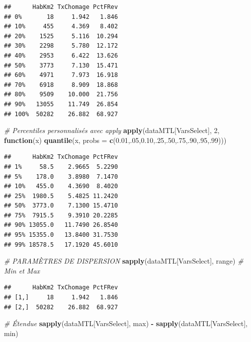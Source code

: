 \documentclass[
  11pt,
  french,
]{book}
\makeatletter
\newenvironment{Shaded}{\begin{snugshade}}{\end{snugshade}}
\newcommand{\CommentTok}[1]{\textcolor[rgb]{0.56,0.35,0.01}{\textit{#1}}}
\newcommand{\ControlFlowTok}[1]{\textcolor[rgb]{0.13,0.29,0.53}{\textbf{#1}}}
\newcommand{\DataTypeTok}[1]{\textcolor[rgb]{0.13,0.29,0.53}{#1}}
\newcommand{\DecValTok}[1]{\textcolor[rgb]{0.00,0.00,0.81}{#1}}
\newcommand{\FloatTok}[1]{\textcolor[rgb]{0.00,0.00,0.81}{#1}}
\newcommand{\KeywordTok}[1]{\textcolor[rgb]{0.13,0.29,0.53}{\textbf{#1}}}
\newcommand{\NormalTok}[1]{#1}
\newcommand{\OperatorTok}[1]{\textcolor[rgb]{0.81,0.36,0.00}{\textbf{#1}}}
\newcommand{\StringTok}[1]{\textcolor[rgb]{0.31,0.60,0.02}{#1}}
\newenvironment{kframe}{%
\medskip{}
\setlength{\fboxsep}{.8em}
 \def\at@end@of@kframe{}%
 \ifinner\ifhmode%
  \def\at@end@of@kframe{\end{minipage}}%
  \begin{minipage}{\columnwidth}%
 \fi\fi%
 \def\FrameCommand##1{\hskip\@totalleftmargin \hskip-\fboxsep
 \colorbox{shadecolor}{##1}\hskip-\fboxsep
     \hskip-\linewidth \hskip-\@totalleftmargin \hskip\columnwidth}%
 \MakeFramed {\advance\hsize-\width
   \@totalleftmargin\z@ \linewidth\hsize
   \@setminipage}}%
 {\par\unskip\endMakeFramed%
 \at@end@of@kframe}
\renewenvironment{Shaded}{\begin{kframe}}{\end{kframe}}
\makeatother
\begin{document}
\begin{verbatim}
##      HabKm2 TxChomage PctFRev
## 0%       18     1.942   1.846
## 10%     455     4.369   8.402
## 20%    1525     5.116  10.294
## 30%    2298     5.780  12.172
## 40%    2953     6.422  13.626
## 50%    3773     7.130  15.471
## 60%    4971     7.973  16.918
## 70%    6918     8.909  18.868
## 80%    9509    10.000  21.756
## 90%   13055    11.749  26.854
## 100%  50282    26.882  68.927
\end{verbatim}

\begin{Shaded}
\begin{Highlighting}[]
\CommentTok{# Percentiles personnalisés avec apply}
\KeywordTok{apply}\NormalTok{(dataMTL[VarsSelect], }\DecValTok{2}\NormalTok{, }
      \ControlFlowTok{function}\NormalTok{(x) }\KeywordTok{quantile}\NormalTok{(x, }\DataTypeTok{probs =} \KeywordTok{c}\NormalTok{(}\FloatTok{0.01}\NormalTok{,.}\DecValTok{05}\NormalTok{,}\FloatTok{0.10}\NormalTok{,.}\DecValTok{25}\NormalTok{,.}\DecValTok{50}\NormalTok{,.}\DecValTok{75}\NormalTok{,.}\DecValTok{90}\NormalTok{,.}\DecValTok{95}\NormalTok{,.}\DecValTok{99}\NormalTok{)))}
\end{Highlighting}
\end{Shaded}

\begin{verbatim}
##      HabKm2 TxChomage PctFRev
## 1%     58.5    2.9665  5.2290
## 5%    178.0    3.8980  7.1470
## 10%   455.0    4.3690  8.4020
## 25%  1980.5    5.4825 11.2420
## 50%  3773.0    7.1300 15.4710
## 75%  7915.5    9.3910 20.2285
## 90% 13055.0   11.7490 26.8540
## 95% 15355.0   13.8400 31.7530
## 99% 18578.5   17.1920 45.6010
\end{verbatim}

\begin{Shaded}
\begin{Highlighting}[]
\CommentTok{# PARAMÈTRES DE DISPERSION}
\KeywordTok{sapply}\NormalTok{(dataMTL[VarsSelect], range)  }\CommentTok{# Min et Max}
\end{Highlighting}
\end{Shaded}

\begin{verbatim}
##      HabKm2 TxChomage PctFRev
## [1,]     18     1.942   1.846
## [2,]  50282    26.882  68.927
\end{verbatim}

\begin{Shaded}
\begin{Highlighting}[]
\CommentTok{# Étendue}
\KeywordTok{sapply}\NormalTok{(dataMTL[VarsSelect], max) }\OperatorTok{-}\StringTok{ }\KeywordTok{sapply}\NormalTok{(dataMTL[VarsSelect], min)}
\end{Highlighting}
\end{Shaded}
\end{document}
